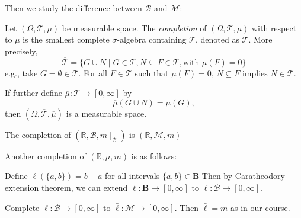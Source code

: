 Then we study the difference between $\mathcal{B}$ and $\mathcal{M}$:

\begin{definition}[Completion]
Let $(\Omega,\mathcal{T},\mu)$ be measurable space.
The \emph{completion} of $(\Omega,\mathcal{T},\mu)$ with respect to $\mu$ 
is the smallest complete $\sigma$-algebra containing $\mathcal{T}$, denoted as $\overline{\mathcal{T}}$.
More precisely, 
\[
\overline{\mathcal{T}} = \{G\cup N\mid G\in\mathcal{T}, N\subseteq F\in\mathcal{T}, \text{with }\mu(F)=0\}
\]
e.g., take $G = \emptyset\in\mathcal{T}$.
For all $F\in\mathcal{T}$ such that $\mu(F)=0$, $N\subseteq F$ implies $N\in\overline{\mathcal{T}}$.
\end{definition}
\begin{remark}
If further define $\overline{\mu}:\overline{\mathcal{T}}\to[0,\infty]$ by
\[
\overline{\mu}(G\cup N) = \mu(G), 
\]
then $(\Omega,\overline{\mathcal{T}},\overline{\mu})$ is a measurable space.
\end{remark}

\begin{theorem}
The completion of $(\mathbb{R},\mathcal{B},m\mid_{\mathcal{B}})$ is $(\mathbb{R},\mathcal{M},m)$
\end{theorem}

\begin{remark}
Another completion of $(\mathbb{R},\mu,m)$ is as follows:

Define $\ell(\{a,b\}) = b-a$ for all intervals $\{a,b\}\in\bm B$
Then by Caratheodory extension theorem, we can extend $\ell:\bm B\to[0,\infty]$ to $\ell:\mathcal{B}\to[0,\infty]$.


Complete $\ell:\mathcal{B}\to[0,\infty]$ to $\bar{\ell}:\mathcal{M}\to[0,\infty]$.
Then $\bar{\ell}=m$ as in our course.

\end{remark}











